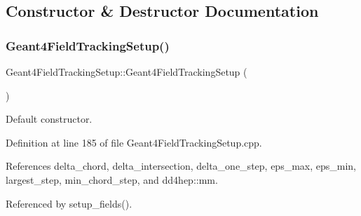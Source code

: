 \subsection{Constructor \& Destructor Documentation}
\hypertarget{struct_d_d4hep_1_1_simulation_1_1_geant4_field_tracking_setup_a282e719af272a3ea7fff2e80b5501539}{}\label{struct_d_d4hep_1_1_simulation_1_1_geant4_field_tracking_setup_a282e719af272a3ea7fff2e80b5501539} 
\subsubsection{\texorpdfstring{Geant4\+Field\+Tracking\+Setup()}{Geant4FieldTrackingSetup()}}
{\footnotesize\ttfamily Geant4\+Field\+Tracking\+Setup\+::\+Geant4\+Field\+Tracking\+Setup (\begin{DoxyParamCaption}{ }\end{DoxyParamCaption})}



Default constructor. 



Definition at line 185 of file Geant4\+Field\+Tracking\+Setup.\+cpp.



References delta\+\_\+chord, delta\+\_\+intersection, delta\+\_\+one\+\_\+step, eps\+\_\+max, eps\+\_\+min, largest\+\_\+step, min\+\_\+chord\+\_\+step, and dd4hep\+::mm.



Referenced by setup\+\_\+fields().

\hypertarget{struct_d_d4hep_1_1_simulation_1_1_geant4_field_tracking_setup_a2ada20da4d69771adbef82115109712e}{}\label{struct_d_d4hep_1_1_simulation_1_1_geant4_field_tracking_setup_a2ada20da4d69771adbef82115109712e} 
